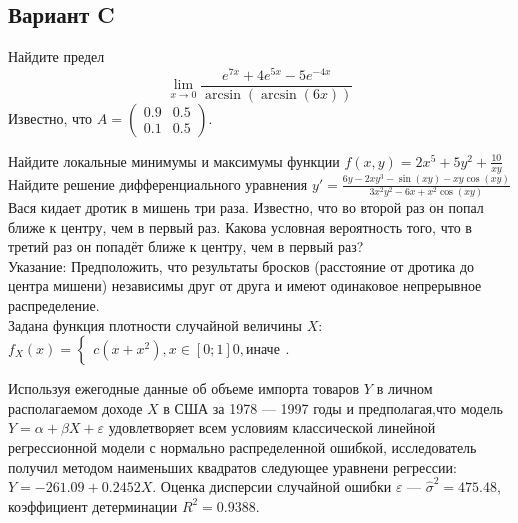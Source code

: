 \documentclass[addpoints, answers]{exam} %
\begin{document}
\subsection{Вариант C}
\begin{questions}
\question Найдите предел 
\[
\lim_{x\to 0} \frac{e^{7x}+4e^{5x}-5e^{-4x}}{\arcsin \left(\arcsin(6x)\right)}
\]
\question Известно, что $A=
\left(\begin{array}{cc}
0.9 & 0.5\\
0.1 & 0.5
\end{array}\right)$.
\question Найдите локальные минимумы и максимумы функции $f(x,y)=2x^5+5y^2+\frac{10}{xy}$\\
\question  Найдите решение дифференциального уравнения $y'=\frac{6y-2xy^3-\sin(xy)-xy\cos(xy)}{3x^2y^2-6x+x^2\cos(xy)}$\\
\question  Вася кидает дротик в мишень три раза. Известно, что во второй раз он попал ближе к центру, чем в первый раз. Какова условная вероятность того, что в третий раз он попадёт ближе к центру, чем в первый раз?\\
Указание: Предположить, что результаты бросков (расстояние от дротика до центра мишени) независимы друг от друга и имеют одинаковое непрерывное распределение.\\
\question  Задана функция плотности случайной величины $X$:\\
$f_X(x)=\begin{cases}
c(x+x^2), x \in [0;1]
0, \text{иначе}
\end{cases}$.
\question  Используя ежегодные данные об объеме импорта товаров $Y$ в личном располагаемом доходе $X$ в США за 1978 --- 1997 годы и предполагая,что модель $Y=\alpha+\beta X+\varepsilon$ удовлетворяет всем условиям классической линейной регрессионной модели с нормально распределенной ошибкой, исследователь получил методом наименьших квадратов следующее уравнени регрессии: $Y=-261.09+0.2452X$. Оценка дисперсии случайной ошибки $\varepsilon$ --- $\hat{\sigma}^2=475.48$, коэффициент детерминации $R^2=0.9388$.
\begin{parts}

\end{parts}
\end{questions}
\end{document}
